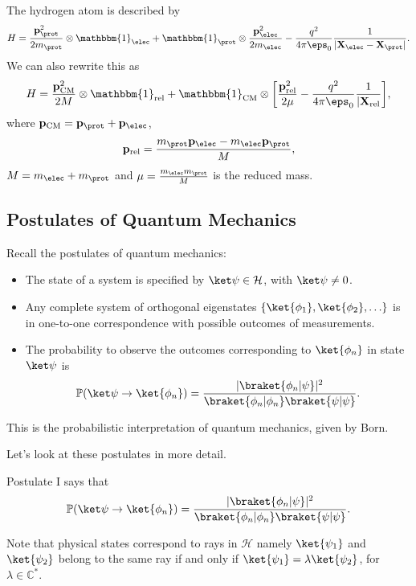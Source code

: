 \documentclass[12pt]{article}
\begin{document}
\begin{exbox}
	The hydrogen atom is described by
	\[
	H = \frac{\mathbf{p}_\prot^2}{2m_\prot} \otimes \mathbbm{1}_{\elec} + \mathbbm{1}_{\prot} \otimes \frac{\mathbf{p}_\elec^2}{2m_\elec} - \frac{q^2}{4 \pi \eps_0} \frac{1}{|\mathbf{X}_\elec - \mathbf{X}_\prot|}.
	\]
	We can also rewrite this as
	\[
		H = \frac{\mathbf{p}_{\mathrm{CM}}^2}{2M} \otimes \mathbbm{1}_{\mathrm{rel}} + \mathbbm{1}_{\mathrm{CM}} \otimes \biggl[ \frac{\mathbf{p}_{\mathrm{rel}}^2}{2\mu} - \frac{q^2}{4 \pi \eps_0} \frac{1}{|\mathbf{X}_{\mathrm{rel}}} \biggr],
	\]
	where $\mathbf{p}_{\mathrm{CM}} = \mathbf{p}_\prot + \mathbf{p}_\elec$,
	\[
	\mathbf{p}_{\mathrm{rel}} = \frac{m_\prot \mathbf{p}_\elec - m_\elec \mathbf{p}_\prot}{M},
	\]
	$M = m_\elec + m_\prot$ and $\mu = \frac{m_\elec m_\prot}{M}$ is the reduced mass.
\end{exbox}

\subsection{Postulates of Quantum Mechanics}
\label{sub:postulates_again}

Recall the postulates of quantum mechanics:
\begin{itemize}
	\item The state of a system is specified by $\ket \psi \in \mathcal{H}$, with $\ket \psi \neq 0$.
	\item Any complete system of orthogonal eigenstates $\{\ket {\phi_1}, \ket {\phi_2}, \ldots\}$ is in one-to-one correspondence with possible outcomes of measurements.
	\item The probability to observe the outcomes corresponding to $\ket {\phi_n}$ in state $\ket \psi$ is
		\[
			\mathbb{P}(\ket \psi \to \ket {\phi_n}) = \frac{|\braket{\phi_n|\psi}|^2}{\braket{\phi_n|\phi_n}\braket{\psi|\psi}}.
		\]
\end{itemize}

This is the probabilistic interpretation of quantum mechanics, given by Born.


Let's look at these postulates in more detail.

Postulate I says that
\[
	\mathbb{P}(\ket \psi \to \ket{\phi_n}) = \frac{|\braket{\phi_n|\psi}|^2}{\braket{\phi_n|\phi_n}\braket{\psi|\psi}}.
\]

Note that physical states correspond to rays in $\mathcal{H}$ namely $\ket {\psi_1}$ and $\ket{\psi_2}$ belong to the same ray if and only if $\ket {\psi_1} = \lambda \ket{\psi_2}$, for $\lambda \in \mathbb{C}^{\ast}$.
\end{document}
